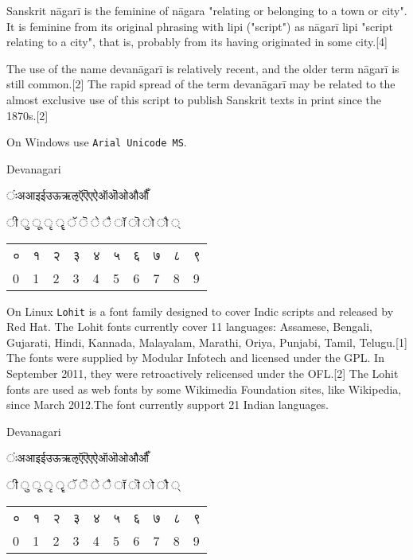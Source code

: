 Sanskrit nāgarī is the feminine of nāgara "relating or belonging to a town or city". It is feminine from its original phrasing with lipi ("script") as nāgarī lipi "script relating to a city", that is, probably from its having originated in some city.[4]

The use of the name devanāgarī is relatively recent, and the older term nāgarī is still common.[2] The rapid spread of the term devanāgarī may be related to the almost exclusive use of this script to publish Sanskrit texts in print since the 1870s.[2]

On Windows use \texttt{Arial Unicode MS}. 
\medskip

\newfontfamily{}

\begin{scriptexample}[]{Devanagari}
{\begin{center}\parindent0pt\devanagari

ंःअआइईउऊऋऌऍऎएऐऑऒओऔऔँ \par 

ी	ु	ू	ृ	ॄ	ॅ	ॆ	े	ै	ॉ	ॊ	ो	ौ	्	\par

\bigskip		
\begin{tabular}{lll lll lll l}
०	&१	&२	&३	&४	&५	&६	&७	&८	&९\\
0	&1	&2	&3	&4	&5	&6	&7	&8	&9\\
\end{tabular}
\end{center}	
}
\end{scriptexample}


On Linux \texttt{Lohit} is a font family designed to cover Indic scripts and released by Red Hat. The Lohit fonts currently cover 11 languages: Assamese, Bengali, Gujarati, Hindi, Kannada, Malayalam, Marathi, Oriya, Punjabi, Tamil, Telugu.[1] The fonts were supplied by Modular Infotech and licensed under the GPL. In September 2011, they were retroactively relicensed under the OFL.[2] The Lohit fonts are used as web fonts by some Wikimedia Foundation sites, like Wikipedia, since March 2012.The font currently support 21 Indian languages. 

\newfontfamily{}

\begin{scriptexample}[]{Devanagari}
\begin{center}\parindent0pt\devanagarilohit

ंःअआइईउऊऋऌऍऎएऐऑऒओऔऔँ \par 

ी	ु	ू	ृ	ॄ	ॅ	ॆ	े	ै	ॉ	ॊ	ो	ौ	्	\par

\bigskip		
\begin{tabular}{lll lll lll l}
०	&१	&२	&३	&४	&५	&६	&७	&८	&९\\
0	&1	&2	&3	&4	&5	&6	&7	&8	&9\\
\end{tabular}
\end{center}
\end{scriptexample}

